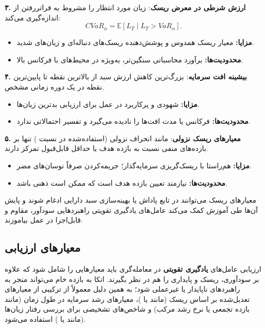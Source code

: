 \documentclass[12pt, a4paper]{report}
\begin{document}
\bigskip
\textbf{۳. ارزش شرطی در معرض ریسک}:  
زیان مورد انتظار را مشروط به فراتررفتن از  اندازه‌گیری می‌کند:
\[
CVaR_{\alpha} = \mathbb{E}[L_T \mid L_T > VaR_{\alpha}].
\]
\begin{itemize}
    \item \textbf{مزایا:} معیار ریسک همدوس و پوشش‌دهنده ریسک‌های دنباله‌ای و زیان‌های شدید.  
    \item \textbf{محدودیت‌ها:} برآورد محاسباتی سنگین‌تر، به‌ویژه در محیط‌های با فرکانس بالا.  
\end{itemize}

\bigskip
\textbf{۴. بیشینه افت سرمایه}:  
بزرگ‌ترین کاهش ارزش سبد از بالاترین نقطه تا پایین‌ترین نقطه در یک دوره زمانی مشخص.

\begin{itemize}
    \item \textbf{مزایا:} شهودی و پرکاربرد در عمل برای ارزیابی بدترین زیان‌ها.  
    \item \textbf{محدودیت‌ها:} فرکانس یا مدت افت‌ها را نادیده می‌گیرد و تفسیر احتمالاتی ندارد.  
\end{itemize}

\bigskip
\textbf{۵. معیارهای ریسک نزولی}:  
مانند انحراف نزولی (استفاده‌شده در نسبت ) تنها بر بازده‌های منفی نسبت به بازده هدف یا حداقل قابل‌قبول تمرکز دارند.  
\begin{itemize}
    \item \textbf{مزایا:} هم‌راستا با ریسک‌گریزی سرمایه‌گذار؛ جریمه‌کردن صرفاً نوسان‌های مضر.  
    \item \textbf{محدودیت‌ها:} نیازمند تعیین بازده هدف است که ممکن است ذهنی باشد.  
\end{itemize}

معیارهای ریسک می‌توانند در تابع پاداش یا بهینه‌سازی سبد دارایی ادغام شوند و پایش آن‌ها طی آموزش کمک می‌کند عامل‌های یادگیری تقویتی راهبردهایی سودآور، مقاوم و قابل‌اجرا در عمل بیاموزند.

\subsection{معیارهای ارزیابی}\label{subsec:evaluation-metrics}

ارزیابی عامل‌های \textbf{یادگیری تقویتی} در معامله‌گری باید معیارهایی را شامل شود که علاوه بر سودآوری، ریسک و پایداری را هم در نظر بگیرند. اتکا به بازده خام می‌تواند منجر به راهبردهای ناپایدار یا غیرعملی شود؛ به همین دلیل معمولاً از ترکیبی از معیارهای تعدیل‌شده بر اساس ریسک (مانند  یا )، معیارهای رشد سرمایه در طول زمان (مانند بازده تجمعی یا نرخ رشد مرکب) و شاخص‌های تشخیصی برای بررسی رفتار زیان‌ها (مانند  یا ) استفاده می‌شود.
\end{document}
